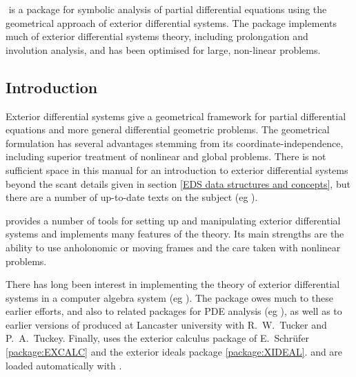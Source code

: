 



\ifdefined\VerbMath
\(
\newcommand{\deriv}{\mathrm{d}}
\)%
\else
\newcommand{\deriv}{\mathrm{d}}
\fi
%
 is a \REDUCE package for symbolic analysis of partial differential
equations using the geometrical approach of exterior differential
systems. The package implements much of exterior differential systems
theory, including prolongation and involution analysis, and has been
optimised for large, non-linear problems.



\subsection{Introduction}

Exterior differential systems give a geometrical framework for partial
differential equations and more general differential geometric problems.
The geometrical formulation has several advantages stemming from its
coordinate-independence, including superior treatment of nonlinear and
global problems. There is not sufficient space in this manual for an
introduction to exterior differential systems beyond the scant details
given in section \ref{EDS data structures and concepts}, but there are a
number of up-to-date texts on the subject (eg \cite{Bryant:1991,Spivak:1979}).

 provides a number of tools for setting up and manipulating exterior
differential systems and implements many features of the theory. Its main
strengths are the ability to use anholonomic or moving frames and the care
taken with nonlinear problems.

There has long been interest in implementing the theory of exterior
differential systems in a computer algebra system (eg
\cite{Arais:1974,Ganzha:1981,Hartley:91}). The  package owes much to these
earlier efforts, and also to related packages for PDE analysis (eg
\cite{Mansfield:1993,reid_1991,Seiler:1995}), as well as to earlier versions of
 produced at Lancaster university with R.~W.~Tucker and
P.~A.~Tuckey. Finally,  uses the exterior calculus package  of
E.~Schr{\"u}fer \ref{package:EXCALC} and the exterior ideals package 
\ref{package:XIDEAL}.  and  are loaded automatically with .

